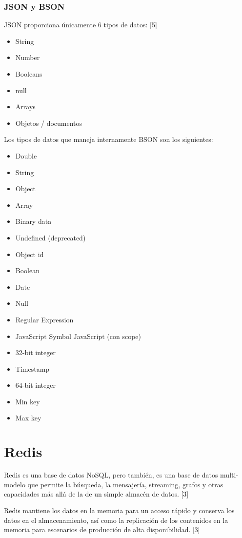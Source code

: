 \documentclass[twocolumn]{article}
\begin{document}
\subsubsection{JSON y BSON}

JSON proporciona únicamente 6 tipos de datos: [5]

\begin{itemize}
  \item String
  \item Number
  \item Booleans
  \item null
  \item Arrays
  \item Objetos / documentos
\end{itemize}

Los tipos de datos que maneja internamente BSON son los siguientes:

\begin{itemize}
  \item Double
  \item String
  \item Object
  \item Array
  \item Binary data
  \item Undefined (deprecated)
  \item Object id
  \item Boolean
  \item Date
  \item Null
  \item Regular Expression
  \item JavaScript Symbol JavaScript (con scope)
  \item 32-bit integer
  \item Timestamp
  \item 64-bit integer
  \item Min key
  \item Max key
\end{itemize}

\section{Redis}

Redis es una base de datos NoSQL, pero también, es una base de datos multi-modelo que permite la búsqueda, la mensajería, streaming, grafos y otras capacidades más allá de la de un simple almacén de datos. [3]

Redis mantiene los datos en la memoria para un acceso rápido y conserva los datos en el almacenamiento, así como la replicación de los contenidos en la memoria para escenarios de producción de alta disponibilidad. [3]
\end{document}
